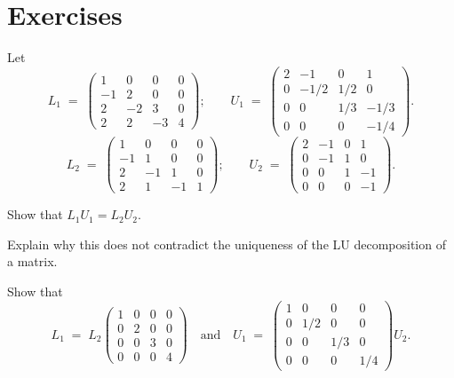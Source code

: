 
\section{Exercises}

\begin{exercises}

\item Let
\[
L_1 \;=\; \begin{pmatrix} 1 & 0 & 0 & 0\\ -1 & 2 & 0 & 0\\ 2 & -2 & 3 & 0\\ 2 & 2 & -3 & 4\end{pmatrix};
\qquad
U_1 \;=\; \begin{pmatrix} 2 & -1 & 0 & 1\\ 0 & -1/2 & 1/2 & 0\\ 0 & 0 & 1/3 & -1/3\\ 0 & 0 & 0 & -1/4\end{pmatrix}.
\]
\[
L_2 \;=\; \begin{pmatrix} 1 & 0 & 0 & 0\\ -1 & 1 & 0 & 0\\ 2 & -1 & 1 & 0\\ 2 & 1 & -1 & 1\end{pmatrix};
\qquad
U_2 \;=\; \begin{pmatrix} 2 & -1 & 0 & 1\\ 0 & -1 & 1 & 0\\ 0 & 0 & 1 & -1\\ 0 & 0 & 0 & -1\end{pmatrix}.
\]
\begin{subparts}
\item Show that $L_1U_1 = L_2U_2$.
\item Explain why this does not contradict the uniqueness of the LU decomposition of a matrix.
\item Show that
\[
L_1 \;=\; L_2\begin{pmatrix} 1&0&0&0\\ 0&2&0&0\\ 0&0&3&0\\ 0&0&0&4\end{pmatrix}
\quad \text{and} \quad
U_1 \;=\; \begin{pmatrix} 1&0&0&0\\ 0&1/2&0&0\\ 0&0&1/3&0\\ 0&0&0&1/4\end{pmatrix}U_2.
\]
\end{subparts}


\end{exercises}
